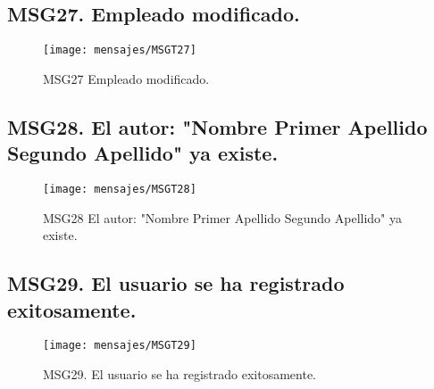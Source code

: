 \subsection{MSG27. Empleado modificado.}
    \begin{figure}[htbp]
        \begin{center}
            \texttt{[image: mensajes/MSGT27]}
            \caption{MSG27 Empleado modificado.}
            \label{fig:MSG27}
        \end{center}
    \end{figure}
    
\subsection{MSG28. El autor: "Nombre Primer Apellido Segundo Apellido" ya existe.}
    \begin{figure}[htbp]
        \begin{center}
            \texttt{[image: mensajes/MSGT28]}
            \caption{MSG28 El autor: "Nombre Primer Apellido Segundo Apellido" ya existe.}
            \label{fig:MSG28}
        \end{center}
    \end{figure}    

\subsection{MSG29. El usuario se ha registrado exitosamente.}
    \begin{figure}[htbp]
        \begin{center}
            \texttt{[image: mensajes/MSGT29]}
            \caption{MSG29. El usuario se ha registrado exitosamente.}
            \label{fig:MSG29}
        \end{center}
    \end{figure}  

